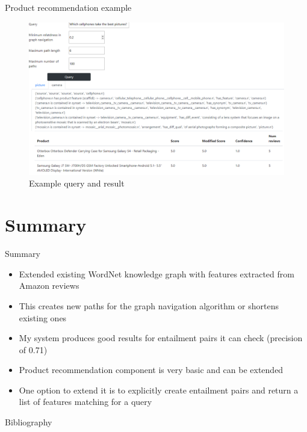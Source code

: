 \documentclass{beamer}
\begin{document}
\begin{frame}[plain]{Product recommendation example}
 \hspace*{-1.8cm}\parbox[t]{\textwidth}{
    \begin{figure}[H]
        \centering
        \includegraphics[scale=0.4]{query-example.PNG}
        \caption{Example query and result}
        \label{fig:query-example}
    \end{figure}
}
\end{frame}

\section{Summary}
\begin{frame}{Summary}
\begin{itemize}
    \item Extended existing WordNet knowledge graph with features extracted from Amazon reviews
    \item This creates new paths for the graph navigation algorithm or shortens existing ones
    \item My system produces good results for entailment pairs it can check (precision of 0.71)
    \item Product recommendation component is very basic and can be extended
    \item One option to extend it is to explicitly create entailment pairs and return a list of features matching for a query
\end{itemize}
\end{frame}

\begin{frame}[allowframebreaks]{Bibliography}


\end{frame}
\end{document}
